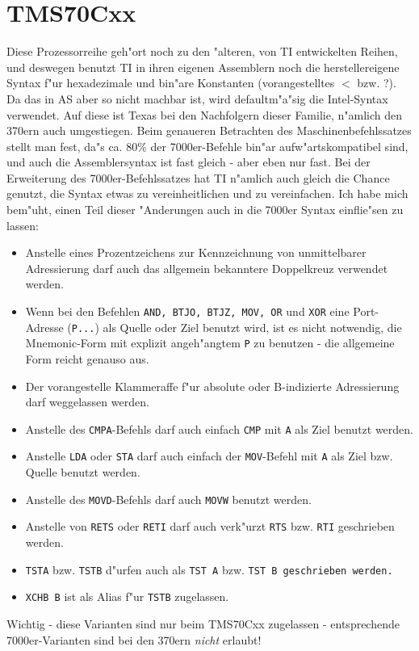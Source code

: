 \documentclass[12pt,a4paper,twoside]{report}
\newcommand{\tty}[1]{{\tt #1}}
\newcommand{\asname}{AS}
\begin{document}

\section{TMS70Cxx}

Diese Prozessorreihe geh"ort noch zu den "alteren, von TI entwickelten
Reihen, und deswegen benutzt TI in ihren eigenen Assemblern noch die
herstellereigene Syntax f"ur hexadezimale und bin"are Konstanten
(vorangestelltes $<$ bzw. ?).  Da das in \asname{} aber so nicht machbar ist, wird
defaultm"a"sig die Intel-Syntax verwendet.  Auf diese ist Texas bei den
Nachfolgern dieser Familie, n"amlich den 370ern auch umgestiegen.  Beim
genaueren Betrachten des Maschinenbefehlssatzes stellt man fest, da"s
ca. 80\% der 7000er-Befehle bin"ar aufw"artskompatibel sind, und auch die
Assemblersyntax ist fast gleich - aber eben nur fast.  Bei der Erweiterung
des 7000er-Befehlssatzes hat TI n"amlich auch gleich die Chance genutzt,
die Syntax etwas zu vereinheitlichen und zu vereinfachen.  Ich habe mich
bem"uht, einen Teil dieser "Anderungen auch in die 7000er Syntax
einflie"sen zu lassen:
\begin{itemize}
\item{Anstelle eines Prozentzeichens zur Kennzeichnung von
      unmittelbarer Adressierung darf auch das allgemein bekanntere Doppelkreuz
      verwendet werden.}
\item{Wenn bei den Befehlen \tty{AND, BTJO, BTJZ, MOV, OR} und
      \tty{XOR} eine Port-Adresse (\tty{P...}) als Quelle oder Ziel
      benutzt wird, ist es nicht notwendig, die Mnemonic-Form mit explizit
      angeh"angtem \tty{P} zu benutzen - die allgemeine Form reicht genauso
      aus.}
\item{Der vorangestelle Klammeraffe f"ur absolute oder B-indizierte
      Adressierung darf weggelassen werden.}
\item{Anstelle des \tty{CMPA}-Befehls darf auch einfach
      \tty{CMP} mit \tty{A} als Ziel benutzt werden.}
\item{Anstelle \tty{LDA} oder \tty{STA} darf auch einfach der \tty{MOV}-Befehl
      mit \tty{A} als Ziel bzw. Quelle benutzt werden.}
\item{Anstelle des \tty{MOVD}-Befehls darf auch \tty{MOVW} benutzt werden.}
\item{Anstelle von \tty{RETS} oder \tty{RETI} darf auch verk"urzt
      \tty{RTS} bzw. \tty{RTI} geschrieben werden.}
\item{\tty{TSTA} bzw. \tty{TSTB} d"urfen auch als \tty{TST A} bzw. \tt{TST
      B} geschrieben werden.}
\item{\tty{XCHB B} ist als Alias f"ur \tty{TSTB} zugelassen.}
\end{itemize}
Wichtig - diese Varianten sind nur beim TMS70Cxx zugelassen - entsprechende
7000er-Varianten sind bei den 370ern {\em nicht} erlaubt!
\end{document}
